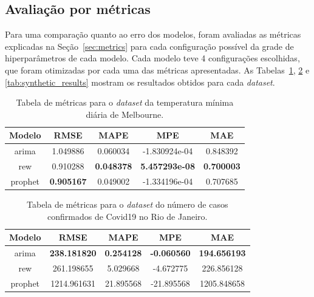 \subsection{Avaliação por métricas} \label{subsec:metrics_eval}
Para uma comparação quanto ao erro dos modelos, foram avaliadas as métricas explicadas na Seção~\ref{sec:metrics} para cada configuração possível da grade de hiperparâmetros de cada modelo. Cada modelo teve 4 configurações escolhidas, que foram otimizadas por cada uma das métricas apresentadas. As Tabelas~\ref{tab:temperature_results}, \ref{tab:covid_results} e \ref{tab:synthetic_results} mostram os resultados obtidos para cada \textit{dataset}.

\begin{table}[!htp]
    \caption{Tabela de métricas para o \textit{dataset} da temperatura mínima diária de Melbourne.}
    \label{tab:temperature_results}
    \setlength\extrarowheight{5pt}
    \centering
    \begin{tabular}{|c|c|c|c|c|}
        \hline
        \rowcolor[HTML]{C0C0C0}
        Modelo  & RMSE              & MAPE              & MPE                   & MAE               \\ \hline
        arima   & 1.049886          & 0.060034          & -1.830924e-04         & 0.848392          \\ \hline
        \rowcolor[HTML]{EFEFEF}
        rew     & 0.910288          & \textbf{0.048378} & \textbf{5.457293e-08} & \textbf{0.700003} \\ \hline
        prophet & \textbf{0.905167} & 0.049002          & -1.334196e-04         & 0.707685          \\ \hline
    \end{tabular}
\end{table}

\begin{table}[!htp]
    \caption{Tabela de métricas para o \textit{dataset} do número de casos confirmados de Covid19 no Rio de Janeiro.}
    \label{tab:covid_results}
    \setlength\extrarowheight{5pt}
    \centering
    \begin{tabular}{|c|c|c|c|c|}
        \hline
        \rowcolor[HTML]{C0C0C0}
        Modelo  & RMSE                & MAPE              & MPE                & MAE                 \\ \hline
        arima   & \textbf{238.181820} & \textbf{0.254128} & \textbf{-0.060560} & \textbf{194.656193} \\ \hline
        \rowcolor[HTML]{EFEFEF}
        rew     & 261.198655          & 5.029668          & -4.672775          & 226.856128          \\ \hline
        prophet & 1214.961631         & 21.895568         & -21.895568         & 1205.848658         \\ \hline
    \end{tabular}
\end{table}

